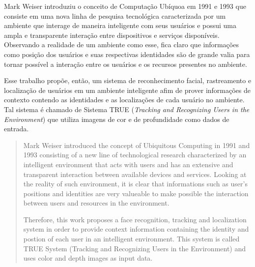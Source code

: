 \begin{resumo}

	Mark Weiser introduziu o conceito de Computação Ubíquoa em 1991 e 1993 que consiste em uma nova linha de pesquisa tecnológica caracterizada por um ambiente que interage de maneira inteligente com seus usuários e possui uma ampla e transparente interação entre dispositivos e serviços disponíveis. Observando a realidade de um ambiente como esse, fica claro que informações como posição dos usuários e suas respectivas identidades são de grande valia para tornar possível a interação entre os usuários e os recursos presentes no ambiente.

	Esse trabalho propõe, então, um sistema de reconhecimento facial, rastreamento e localização de usuários em um ambiente inteligente afim de prover informações de contexto contendo as identidades e as localizações de cada usuário no ambiente. Tal sistema é chamado de Sistema TRUE (\textit{Tracking and Recognizing Users in the Environment}) que utiliza imagens de cor e de profundidade como dados de entrada.

\end{resumo}


\begin{abstract}
	
	Mark Weiser introduced the concept of Ubiquitous Computing in 1991 and 1993 consisting of a new line of technological research characterized by an intelligent environment that acts with users and has an extensive and transparent interaction between available devices and services. Looking at the reality of such environment, it is clear that informations such as user's positions and identities are very valueable to make possible the interaction between users and resources in the environment.

	Therefore, this work proposes a face recognition, tracking and localization system in order to provide context information containing the identity and postion of each user in an intelligent environment. This system is called TRUE System (Tracking and Recognizing Users in the Environment) and uses color and depth images as input data.

\end{abstract}


